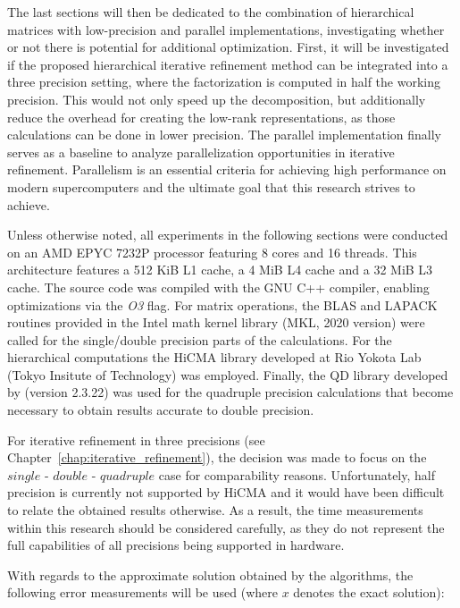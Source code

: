 The last sections will then be dedicated to the combination of hierarchical matrices with low-precision and parallel implementations, investigating whether or not there is potential for additional optimization. First, it will be investigated if the proposed hierarchical iterative refinement method can be integrated into a three precision setting, where the factorization is computed in half the working precision. This would not only speed up the decomposition, but additionally reduce the overhead for creating the low-rank representations, as those calculations can be done in lower precision. The parallel implementation finally serves as a baseline to analyze parallelization opportunities in iterative refinement. Parallelism is an essential criteria for achieving high performance on modern supercomputers and the ultimate goal that this research strives to achieve.

Unless otherwise noted, all experiments in the following sections were conducted on an AMD EPYC 7232P processor featuring 8 cores and 16 threads. This architecture features a 512 KiB L1 cache, a 4 MiB L4 cache and a 32 MiB L3 cache. The source code was compiled with the GNU C++ compiler, enabling optimizations via the \textit{O3} flag. For matrix operations, the BLAS and LAPACK routines provided in the Intel math kernel library (MKL, 2020 version) were called for the single/double precision parts of the calculations. For the hierarchical computations the HiCMA library developed at Rio Yokota Lab (Tokyo Insitute of Technology) was employed. Finally, the QD library developed by \cite{hida_quad-double_2001} (version 2.3.22) was used for the quadruple precision calculations that become necessary to obtain results accurate to double precision.

For iterative refinement in three precisions (see Chapter~\hyperref[chap:iterative_refinement]{\ref{chap:iterative_refinement}}), the decision was made to focus on the $single$ - $double$ - $quadruple$ case for comparability reasons. Unfortunately, half precision is currently not supported by HiCMA and it would have been difficult to relate the obtained results otherwise. As a result, the time measurements within this research should be considered carefully, as they do not represent the full capabilities of all precisions being supported in hardware.

With regards to the approximate solution obtained by the algorithms, the following error measurements will be used (where $x$ denotes the exact solution):

